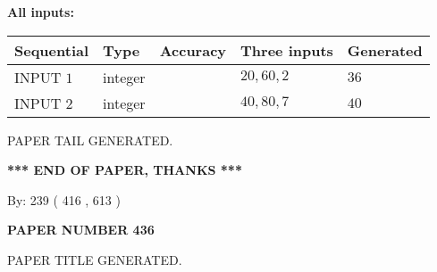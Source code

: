 \documentclass[12pt]{article}
\begin{document}
   
   
   
\noindent\vspace{0.1in}\hspace{-0.08in} {\textbf{\Large{All inputs: }}}
   
   
  
  
\noindent\begin{tabular}{|l|l|l|l|l|}
\hline
 Sequential & Type & Accuracy & Three inputs & Generated \\ 
\hline
 
 
  INPUT $  1 $ & integer &  & $
 20
 , 
 60
 , 
 2
 $ & $ 36 $ 
 \\  \hline  
 
 
  INPUT $  2 $ & integer &  & $
 40
 , 
 80
 , 
 7
 $ & $ 40 $ 
 \\  \hline  
 \end{tabular}
   
   
   
   
   
   
 \vspace{0.2in}
 
   
   
\vspace{2.0in} PAPER TAIL GENERATED.
   
   
   
   
\vspace{1.0in} 
{\textbf{\large{ *** END OF PAPER, THANKS *** }}} 
   
   
\hspace{1.0in} By: 
 239 ( 416 ,  613 )
   
   
   
   
\newpage 
\setcounter{page}{ 
   436001 } 
   
   
   
   
 {\textbf{ \Large{ PAPER NUMBER  436  }}}
   
   
\vspace{0.2in}
   
   
   
   
   
   
   
   
 \vspace{0.2in}
 
 
 
 
   
   
 PAPER TITLE GENERATED.
   
   
   
\vspace{0.2in}
   
\end{document}

